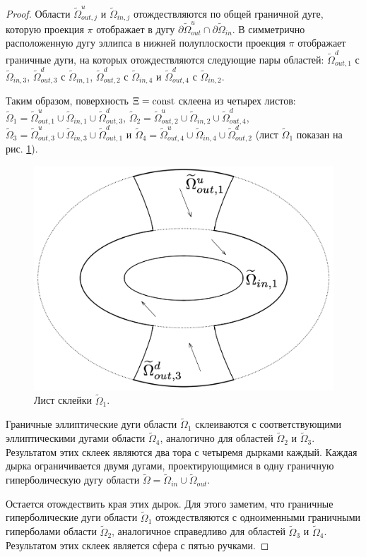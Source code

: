 \begin{proof}
Области $\widetilde{\Omega}_{out, j}^u$ и $\widetilde{\Omega}_{in, j}$ отождествляются по общей граничной дуге, которую проекция $\pi$ отображает в дугу 
$\partial \widetilde{\Omega}_{out}^u \cap \partial \widetilde{\Omega}_{in}$.
В симметрично расположенную дугу эллипса в нижней полуплоскости проекция $\pi$ отображает граничные дуги, на которых отождествляются следующие пары областей: 
$\widetilde{\Omega}_{out, 1}^d$ с $\widetilde{\Omega}_{in, 3}$,
$\widetilde{\Omega}_{out, 3}^d$ с $\widetilde{\Omega}_{in, 1}$,
$\widetilde{\Omega}_{out, 2}^d$ с $\widetilde{\Omega}_{in, 4}$ и 
$\widetilde{\Omega}_{out, 4}^d$ с $\widetilde{\Omega}_{in, 2}$.

Таким образом, поверхность $\Xi = \mathrm{const}$ склеена из четырех листов:
$\widetilde{\Omega}_1 = \widetilde{\Omega}_{out, 1}^u \cup \widetilde{\Omega}_{in, 1} \cup \widetilde{\Omega}_{out, 3}^d$, 
$\widetilde{\Omega}_2 = \widetilde{\Omega}_{out, 2}^u \cup \widetilde{\Omega}_{in, 2} \cup \widetilde{\Omega}_{out, 4}^d$, 
$\widetilde{\Omega}_3 = \widetilde{\Omega}_{out, 3}^u \cup \widetilde{\Omega}_{in, 3} \cup \widetilde{\Omega}_{out, 1}^d$ и 
 $\widetilde{\Omega}_4 = \widetilde{\Omega}_{out, 4}^u \cup \widetilde{\Omega}_{in, 4} \cup \widetilde{\Omega}_{out, 2}^d$ (лист $\widetilde{\Omega}_1$ показан на рис. \ref{fig:pt9:_hyp_page}).
 \begin{figure}[!htb]
 \centering
\includegraphics[width=0.4\linewidth]{images/ch4/section2/problems_vectors_2.pdf}
    \caption{Лист склейки $\widetilde{\Omega}_1$.}
    \label{fig:pt9:_hyp_page}
\end{figure}

 
Граничные эллиптические дуги области $\widetilde{\Omega}_1$  склеиваются с соответствующими эллиптическими дугами  области $\widetilde{\Omega}_4$, аналогично для областей $\widetilde{\Omega}_2$ и $\widetilde{\Omega}_3$. Результатом этих склеек являются два тора с четыремя дырками каждый. 
Каждая дырка ограничивается двумя дугами, проектирующимися в одну граничную гиперболическую дугу области $\widetilde{\Omega} = \widetilde{\Omega}_{in} \cup \widetilde{\Omega}_{out}$.

Остается отождествить края этих дырок. Для этого заметим, что граничные гиперболические дуги области $\widetilde{\Omega}_1$ отождествляются с одноименными граничными гиперболами области $\widetilde{\Omega}_2$, аналогичное справедливо для областей $\widetilde{\Omega}_3$ и $\widetilde{\Omega}_4$. Результатом этих склеек является сфера с пятью ручками. 


\end{proof}
